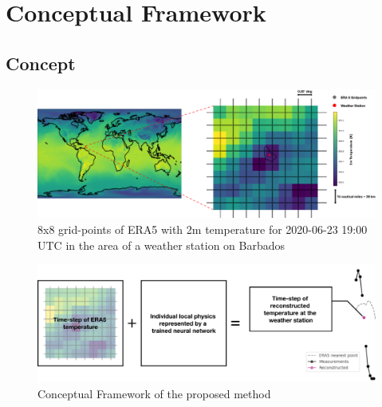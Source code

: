 \section{Conceptual Framework}
\label{sec:design}

\subsection{Concept}

\begin{figure}
    \centering
    \includegraphics[width=\textwidth]{resources/images/ERA5_tas_around_barbados.png}
    \caption{8x8 grid-points of ERA5 with 2m temperature 
    for 2020-06-23 19:00 UTC  in the area of a weather station on Barbados}    
    \label{fig:barbados}
\end{figure}

\begin{figure}
    \centering
    \includegraphics[width=450pt]{resources/images/digitaltwin_schema.png}
    \caption{Conceptual Framework of the proposed method}    
    \label{fig:concept}
\end{figure}

